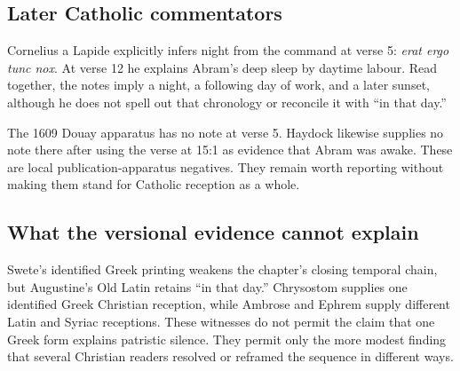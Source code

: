 \subsection{Later Catholic commentators}

Cornelius a Lapide explicitly infers night from the command at verse 5:
\textit{erat ergo tunc nox}. At verse 12 he explains Abram's deep sleep by
daytime labour. Read together, the notes imply a night, a following day of
work, and a later sunset, although he does not spell out that chronology or
reconcile it with ``in that day.''

The 1609 Douay apparatus has no note at verse 5. Haydock likewise supplies no
note there after using the verse at 15:1 as evidence that Abram was awake.
These are local publication-apparatus negatives. They remain worth reporting
without making them stand for Catholic reception as a whole.

\subsection{What the versional evidence cannot explain}

Swete's identified Greek printing weakens the chapter's closing temporal chain,
but Augustine's Old Latin retains ``in that day.'' Chrysostom supplies one
identified Greek Christian reception, while Ambrose and Ephrem supply different
Latin and Syriac receptions. These witnesses do not permit the claim that one
Greek form explains patristic silence. They permit only the more modest
finding that several Christian readers resolved or reframed the sequence in
different ways.

